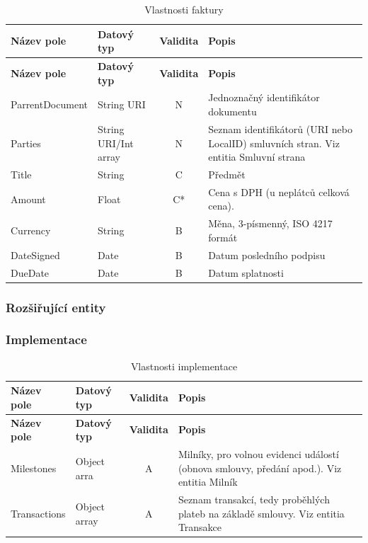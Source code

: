 \begin{center}
\begin{longtable}{lp{20mm}cp{65mm}}
\label{grid_mlmmh} \\
\multicolumn{1}{l}{\textbf{Název pole}} & 
\multicolumn{1}{l}{\textbf{Datový typ}} & 
\multicolumn{1}{l}{\textbf{Validita}} & 
\multicolumn{1}{l}{\textbf{Popis}} \\ \hline 
\endfirsthead
\multicolumn{1}{l}{\textbf{Název pole}} & 
\multicolumn{1}{l}{\textbf{Datový typ}} & 
\multicolumn{1}{l}{\textbf{Validita}} & 
\multicolumn{1}{l}{\textbf{Popis}} \\ \hline 
\hline
\endhead
\endfoot
\caption{Vlastnosti faktury}
\endlastfoot
ParrentDocument & String URI & N & Jednoznačný identifikátor dokumentu \\
Parties & String URI/Int array & N & Seznam identifikátorů (URI nebo LocalID) smluvních stran. Viz entitia Smluvní strana \\
\rowcolor{validateC}Title & String & C & Předmět \\
\rowcolor{validateC}Amount & Float & C* & Cena s DPH (u neplátců celková cena). \\
\rowcolor{validateB}Currency & String & B & Měna, 3-písmenný, ISO 4217 formát \\
\rowcolor{validateB}DateSigned & Date & B & Datum posledního podpisu \\
\rowcolor{validateB}DueDate & Date & B & Datum splatnosti \\
\end{longtable}
\end{center}

\subsubsection*{Rozšiřující entity}

\subsubsection*{Implementace}

\begin{center}
\begin{longtable}{lp{20mm}cp{65mm}}
\label{grid_mlmmh} \\
\multicolumn{1}{l}{\textbf{Název pole}} & 
\multicolumn{1}{l}{\textbf{Datový typ}} & 
\multicolumn{1}{l}{\textbf{Validita}} & 
\multicolumn{1}{l}{\textbf{Popis}} \\ \hline 
\endfirsthead
\multicolumn{1}{l}{\textbf{Název pole}} & 
\multicolumn{1}{l}{\textbf{Datový typ}} & 
\multicolumn{1}{l}{\textbf{Validita}} & 
\multicolumn{1}{l}{\textbf{Popis}} \\ \hline 
\hline
\endhead
\endfoot
\caption{Vlastnosti implementace}
\endlastfoot
\rowcolor{validateA}Milestones & Object arra & A & Milníky, pro volnou evidenci událostí (obnova smlouvy, předání apod.). Viz entitia Milník \\
\rowcolor{validateA}Transactions & Object array & A & Seznam transakcí, tedy proběhlých plateb na základě smlouvy. Viz entitia Transakce \\
\end{longtable}
\end{center}

